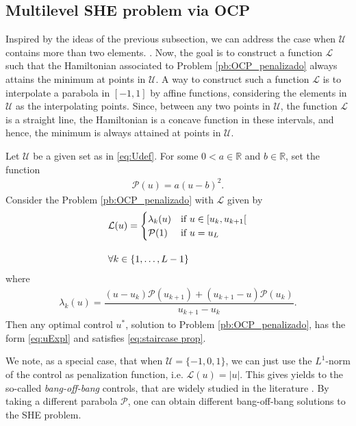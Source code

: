 \documentclass[twocolumn]{autart}    %
\begin{document}
\subsection{Multilevel SHE problem via OCP}

Inspired by the ideas of the previous subsection, we can address the case when $\mathcal{U}$ contains more than two elements. . Now, the goal is to construct a function $\mathcal{L}$ such that the Hamiltonian associated to Problem \ref{pb:OCP_penalizado} always attains the minimum at points in $\mathcal{U}$.
A way to construct such a function $\mathcal{L}$ is to interpolate a parabola in $[-1,1]$ by affine functions, considering the elements in $\mathcal{U}$ as the interpolating points.  Since, between any two points in $\mathcal{U}$,  the function $\mathcal{L}$ is a straight line,  the Hamiltonian is a concave function in these intervals, and hence, the minimum is always attained at points in $\mathcal{U}$.

\vspace{1em}
\begin{theorem}\label{th:PLP}
Let $\mathcal{U}$ be a given set as in \eqref{eq:Udef}.
For some $0<a\in\mathbb{R}$ and $b\in \mathbb{R}$, set the function
\begin{align*}
	\mathcal{P}(u) = a (u-b)^2.
\end{align*}
Consider the Problem \ref{pb:OCP_penalizado} with $\mathcal{L}$ given by
\begin{align}\label{eq:PLP}
	&\mathcal{L}(u) = \begin{cases}
            \lambda_k(u) & \text{if }  u \in [u_k,u_{k+1}[ \\ \mathcal{P}(1) & \text{if } u = u_{L} 
    \end{cases} 
	\\[10pt]
	&\notag \forall k \in \{1,\dots,L-1\} 
\end{align}
where 
\begin{align}\label{eq:lambda k}
	\lambda_k(u) = \dfrac{ (u-u_k)\mathcal{P}(u_{k+1}) + (u_{k+1}- u) \mathcal{P}(u_k)}{u_{k+1} - u_k}.
\end{align}
Then any optimal control $u^\ast$, solution to Problem \ref{pb:OCP_penalizado}, has the form \eqref{eq:uExpl} and satisfies \eqref{eq:staircase prop}.
\end{theorem}

\bigskip

\begin{remark}
We note, as a special case, that when  $\mathcal{U}= \{-1,0,1\}$, we can just use the $L^1$-norm of the control as penalization function, i.e. $\mathcal{L}(u) = |u|$. This gives yields to the so-called \emph{bang-off-bang} controls, that are widely studied in the literature \cite{Wang2020}. By taking a different parabola $\mathcal{P}$, one can obtain different bang-off-bang solutions to the SHE problem.
\end{remark}
\end{document}
